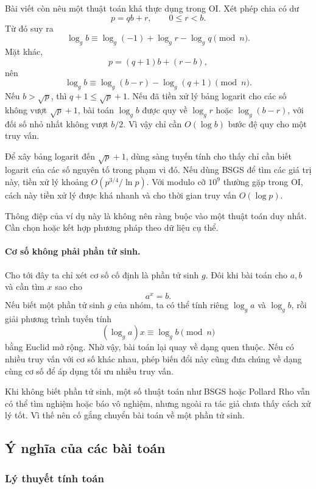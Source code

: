 \documentclass[11pt]{article}
\begin{document}
Bài viết còn nêu một thuật toán khá thực dụng trong OI. Xét phép chia có dư
\[
  p=qb+r,\qquad 0\le r<b.
\]
Từ đó suy ra
\[
  \log_g b\equiv \log_g(-1)+\log_g r-\log_g q \pmod n.
\]
Mặt khác,
\[
  p=(q+1)b+(r-b),
\]
nên
\[
  \log_g b\equiv \log_g(b-r)-\log_g(q+1)\pmod n.
\]
Nếu \(b>\sqrt p\), thì \(q+1\le \sqrt p+1\). Nếu đã tiền xử lý bảng logarit
cho các số không vượt \(\sqrt p+1\), bài toán \(\log_g b\) được quy về
\(\log_g r\) hoặc \(\log_g(b-r)\), với đối số nhỏ nhất không vượt \(b/2\). Vì
vậy chỉ cần \(O(\log b)\) bước đệ quy cho một truy vấn.

Để xây bảng logarit đến \(\sqrt p+1\), dùng sàng tuyến tính cho thấy chỉ cần
biết logarit của các số nguyên tố trong phạm vi đó. Nếu dùng BSGS để tìm các
giá trị này, tiền xử lý khoảng \(O(p^{3/4}/\ln p)\). Với modulo cỡ \(10^9\)
thường gặp trong OI, cách này tiền xử lý được khá nhanh và cho thời gian truy
vấn \(O(\log p)\).

Thông điệp của ví dụ này là không nên ràng buộc vào một thuật toán duy nhất.
Cần chọn hoặc kết hợp phương pháp theo dữ liệu cụ thể.

\paragraph{Cơ số không phải phần tử sinh.}
Cho tới đây ta chỉ xét cơ số cố định là phần tử sinh \(g\). Đôi khi bài toán
cho \(a,b\) và cần tìm \(x\) sao cho
\[
  a^x=b.
\]
Nếu biết một phần tử sinh \(g\) của nhóm, ta có thể tính riêng
\(\log_g a\) và \(\log_g b\), rồi giải phương trình tuyến tính
\[
  (\log_g a)x\equiv \log_g b \pmod n
\]
bằng Euclid mở rộng. Nhờ vậy, bài toán lại quay về dạng quen thuộc. Nếu có
nhiều truy vấn với cơ số khác nhau, phép biến đổi này cũng đưa chúng về dạng
cùng cơ số để áp dụng tối ưu nhiều truy vấn.

Khi không biết phần tử sinh, một số thuật toán như BSGS hoặc Pollard Rho vẫn
có thể tìm nghiệm hoặc báo vô nghiệm, nhưng ngoài ra tác giả chưa thấy cách
xử lý tốt. Vì thế nên cố gắng chuyển bài toán về một phần tử sinh.

\subsection{Ý nghĩa của các bài toán}

\subsubsection{Lý thuyết tính toán}
\end{document}
